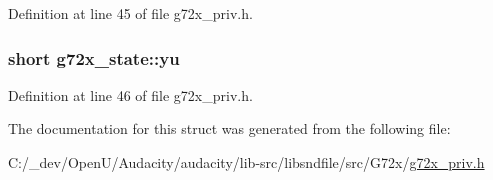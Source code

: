 Definition at line 45 of file g72x\+\_\+priv.\+h.

\subsubsection[{\texorpdfstring{yu}{yu}}]{\setlength{\rightskip}{0pt plus 5cm}short g72x\+\_\+state\+::yu}\hypertarget{structg72x__state_a9b01934f60d42320e079a57e0b977d6d}{}\label{structg72x__state_a9b01934f60d42320e079a57e0b977d6d}


Definition at line 46 of file g72x\+\_\+priv.\+h.



The documentation for this struct was generated from the following file\+:\begin{DoxyCompactItemize}
\item 
C\+:/\+\_\+dev/\+Open\+U/\+Audacity/audacity/lib-\/src/libsndfile/src/\+G72x/\hyperlink{g72x__priv_8h}{g72x\+\_\+priv.\+h}\end{DoxyCompactItemize}
